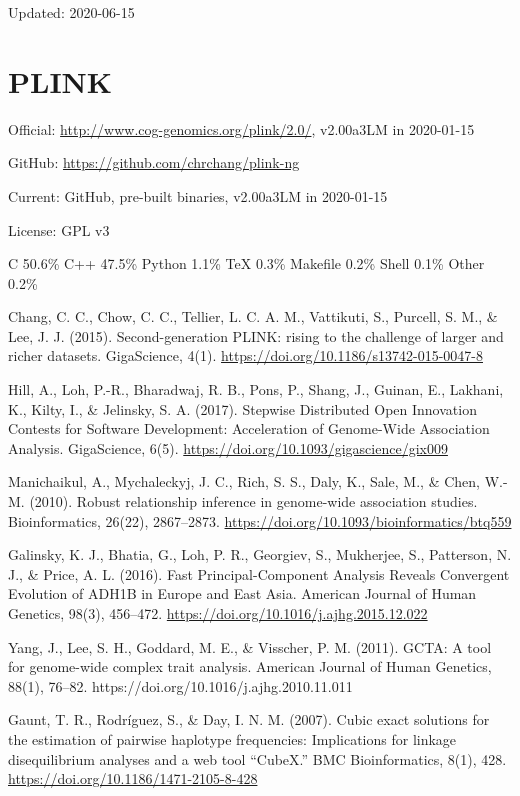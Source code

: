 \documentclass[]{article}
\begin{document}
Updated: 2020-06-15

\section{PLINK}

Official: \url{http://www.cog-genomics.org/plink/2.0/}, v2.00a3LM in 2020-01-15

GitHub: \url{https://github.com/chrchang/plink-ng}

Current: GitHub, pre-built binaries, v2.00a3LM in 2020-01-15

License: GPL v3

C 50.6\% C++ 47.5\% Python 1.1\% TeX 0.3\% Makefile 0.2\% Shell 0.1\% Other 0.2\% 

Chang, C. C., Chow, C. C., Tellier, L. C. A. M., Vattikuti, S., Purcell, S. M., \& Lee, J. J. (2015). Second-generation PLINK: rising to the challenge of larger and richer datasets. GigaScience, 4(1). \url{https://doi.org/10.1186/s13742-015-0047-8}

Hill, A., Loh, P.-R., Bharadwaj, R. B., Pons, P., Shang, J., Guinan, E., Lakhani, K., Kilty, I., \& Jelinsky, S. A. (2017). Stepwise Distributed Open Innovation Contests for Software Development: Acceleration of Genome-Wide Association Analysis. GigaScience, 6(5). \url{https://doi.org/10.1093/gigascience/gix009}

Manichaikul, A., Mychaleckyj, J. C., Rich, S. S., Daly, K., Sale, M., \& Chen, W.-M. (2010). Robust relationship inference in genome-wide association studies. Bioinformatics, 26(22), 2867–2873. \url{https://doi.org/10.1093/bioinformatics/btq559}

Galinsky, K. J., Bhatia, G., Loh, P. R., Georgiev, S., Mukherjee, S., Patterson, N. J., \& Price, A. L. (2016). Fast Principal-Component Analysis Reveals Convergent Evolution of ADH1B in Europe and East Asia. American Journal of Human Genetics, 98(3), 456–472. \url{https://doi.org/10.1016/j.ajhg.2015.12.022}

Yang, J., Lee, S. H., Goddard, M. E., \& Visscher, P. M. (2011). GCTA: A tool for genome-wide complex trait analysis. American Journal of Human Genetics, 88(1), 76–82. {https://doi.org/10.1016/j.ajhg.2010.11.011}

Gaunt, T. R., Rodríguez, S., \& Day, I. N. M. (2007). Cubic exact solutions for the estimation of pairwise haplotype frequencies: Implications for linkage disequilibrium analyses and a web tool “CubeX.” BMC Bioinformatics, 8(1), 428. \url{https://doi.org/10.1186/1471-2105-8-428}
\end{document}
